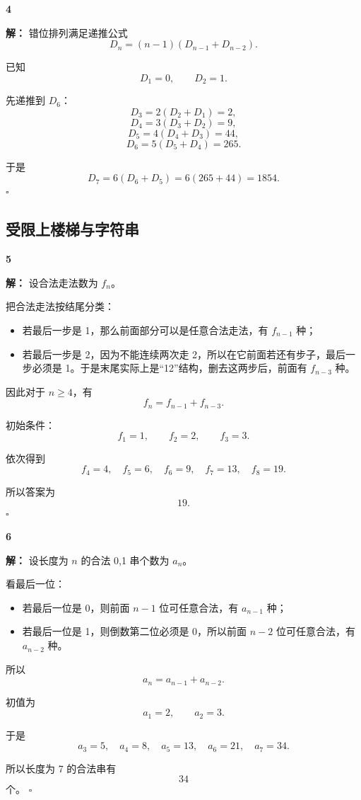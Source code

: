 \documentclass[11pt,a4paper,fontset=fandol]{ctexart}
\theoremstyle{formalexample}
\newenvironment{solution}{\par\noindent\textbf{解：}}{\hfill$\square$\par}
\begin{document}
\textbf{4}\begin{solution}
错位排列满足递推公式
\[
  D_n=(n-1)(D_{n-1}+D_{n-2}).
\]

已知
\[
  D_1=0,
  \qquad
  D_2=1.
\]

先递推到 $D_6$：
\[
  D_3=2(D_2+D_1)=2,
\]
\[
  D_4=3(D_3+D_2)=9,
\]
\[
  D_5=4(D_4+D_3)=44,
\]
\[
  D_6=5(D_5+D_4)=265.
\]

于是
\[
  D_7=6(D_6+D_5)=6(265+44)=1854.
\]
\end{solution}

\subsection*{受限上楼梯与字符串}

\textbf{5}\begin{solution}
设合法走法数为 $f_n$。

把合法走法按结尾分类：
\begin{itemize}
  \item 若最后一步是 1，那么前面部分可以是任意合法走法，有 $f_{n-1}$ 种；
  \item 若最后一步是 2，因为不能连续两次走 2，所以在它前面若还有步子，最后一步必须是 1。于是末尾实际上是“12”结构，删去这两步后，前面有 $f_{n-3}$ 种。
\end{itemize}

因此对于 $n\ge 4$，有
\[
  f_n=f_{n-1}+f_{n-3}.
\]

初始条件：
\[
  f_1=1,
  \qquad
  f_2=2,
  \qquad
  f_3=3.
\]

依次得到
\[
  f_4=4,
  \quad
  f_5=6,
  \quad
  f_6=9,
  \quad
  f_7=13,
  \quad
  f_8=19.
\]

所以答案为
\[
  19.
\]
\end{solution}

\textbf{6}\begin{solution}
设长度为 $n$ 的合法 0,1 串个数为 $a_n$。

看最后一位：
\begin{itemize}
  \item 若最后一位是 0，则前面 $n-1$ 位可任意合法，有 $a_{n-1}$ 种；
  \item 若最后一位是 1，则倒数第二位必须是 0，所以前面 $n-2$ 位可任意合法，有 $a_{n-2}$ 种。
\end{itemize}

所以
\[
  a_n=a_{n-1}+a_{n-2}.
\]

初值为
\[
  a_1=2,
  \qquad
  a_2=3.
\]

于是
\[
  a_3=5,
  \quad
  a_4=8,
  \quad
  a_5=13,
  \quad
  a_6=21,
  \quad
  a_7=34.
\]

所以长度为 7 的合法串有
\[
  34
\]
个。
\end{solution}
\end{document}
